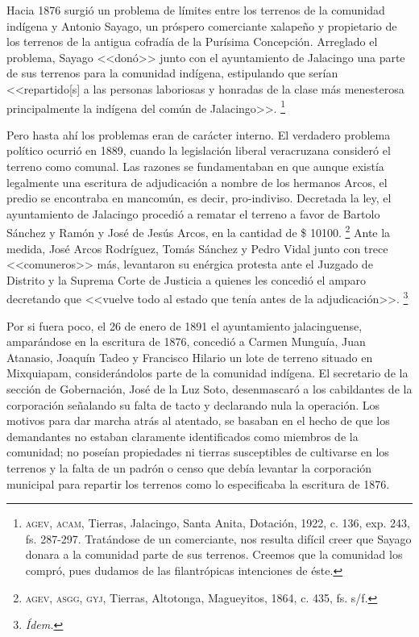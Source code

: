 \documentclass[14pt,twoside,final]{extbook} %
\let\oldfootnote\footnote
\renewcommand\footnote[1]{%
\oldfootnote{\hspace{1mm}#1}}
\begin{document}
Hacia 1876 surgió un problema de límites entre los terrenos de la comunidad indígena y Antonio Sayago, un próspero comerciante xalapeño y propietario de los terrenos de la antigua cofradía de la Purísima Concepción. Arreglado el problema, Sayago <<donó>> junto con el ayuntamiento de Jalacingo una parte de sus terrenos para la comunidad indígena, estipulando que serían <<repartido[s] a las personas laboriosas y honradas de la clase más menesterosa principalmente la indígena del común de
Jalacingo>>.\footnote{\textsc{agev, acam}, Tierras, Jalacingo, Santa Anita, Dotación, 1922, c. 136, exp. 243, fs. 287-297. Tratándose de un comerciante, nos resulta difícil creer que Sayago donara a la comunidad parte de sus terrenos. Creemos que la comunidad los compró, pues dudamos de las filantrópicas intenciones de éste.}

Pero hasta ahí los problemas eran de carácter interno. El verdadero problema político ocurrió en 1889, cuando la legislación liberal veracruzana consideró el terreno como comunal. Las razones se fundamentaban en que aunque existía legalmente una escritura de adjudicación a nombre de los hermanos Arcos, el predio se encontraba en mancomún, es decir, pro-indiviso. Decretada la ley, el ayuntamiento de Jalacingo procedió a rematar el terreno a favor de Bartolo Sánchez y Ramón y José de Jesús Arcos, en la cantidad de \$ 10100.\footnote{\textsc{agev, asgg, gyj}, Tierras, Altotonga, Magueyitos, 1864, c. 435, fs. s/f.} Ante la medida, José Arcos Rodríguez, Tomás Sánchez y Pedro Vidal junto con trece <<comuneros>> más, levantaron su enérgica protesta ante el Juzgado de Distrito y la Suprema Corte de Justicia a quienes les concedió el amparo decretando que <<vuelve todo al estado que tenía antes de la adjudicación>>.\footnote{\em Ídem.}

Por si fuera poco, el 26 de enero de 1891 el ayuntamiento jalacinguense, amparándose en la escritura de 1876, concedió a Carmen Munguía, Juan Atanasio, Joaquín Tadeo y Francisco Hilario un lote de terreno situado en Mixquiapam, considerándolos parte de la comunidad indígena. El secretario de la sección de Gobernación, José de la Luz Soto, desenmascaró a los cabildantes de la corporación señalando su falta de tacto y declarando nula la operación. Los motivos para dar marcha atrás al atentado, se basaban en el hecho de que los demandantes no estaban claramente identificados como miembros de la comunidad; no poseían propiedades ni tierras susceptibles de cultivarse en los terrenos y la falta de un padrón o censo que debía levantar la corporación municipal para repartir los terrenos como lo especificaba la escritura de 1876.
\end{document}

